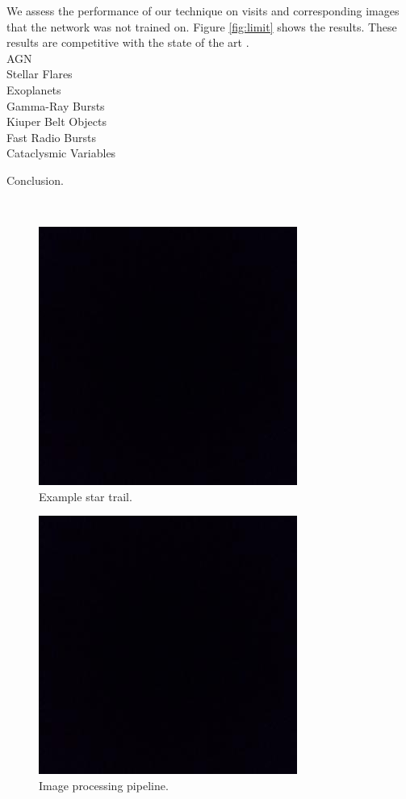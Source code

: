 \documentclass[12pt, letterpaper]{article}
\begin{document}
We assess the performance of our technique on visits and corresponding images that the network was not trained on. Figure \ref{fig:limit} shows the results. These results are competitive with the state of the art \citep{2016SPIE.9908E..0YD}. 
\\

{\color{green}
\noindent AGN\\
Stellar Flares\\
Exoplanets\\
Gamma-Ray Bursts\\
Kiuper Belt Objects\\
Fast Radio Bursts\\
Cataclysmic Variables\\
}

Conclusion.

\
\begin{figure}[htb]
\center
\includegraphics{bbox.jpeg}
\caption{Example star trail.}
\label{fig:trail}
\end{figure}

\begin{figure}[htb]
\center
\includegraphics{bbox.jpeg}
\caption{Image processing pipeline.}
\label{fig:pipeline}
\end{figure}
\end{document}
